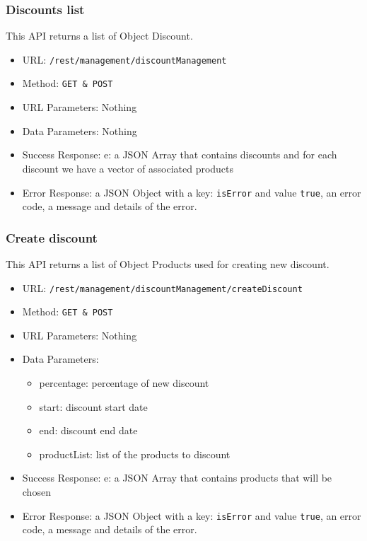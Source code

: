 \subsubsection*{Discounts list}
This API returns a list of Object Discount.

\begin{itemize}
    \item URL: \texttt{/rest/management/discountManagement}
    \item Method: \texttt{{GET \& POST}}
    \item URL Parameters: Nothing
    \item Data Parameters: Nothing
    \item Success Response: e: a JSON Array that contains discounts and for each discount we have a vector of associated products
    \item Error Response: a JSON Object with a key: \texttt{isError}  and value \texttt{true}, an error code, a message and details of the error.
\end{itemize}

\subsubsection*{Create discount}
This API returns a list of Object Products used for creating new discount.

\begin{itemize}
    \item URL: \texttt{/rest/management/discountManagement/createDiscount}
    \item Method: \texttt{{GET \& POST}}
    \item URL Parameters: Nothing
    \item Data Parameters: 
    \begin{itemize}
        \item percentage: percentage of new discount
        \item start: discount start date
        \item end: discount end date
        \item productList: list of the products to discount
    \end{itemize} 
    \item Success Response: e: a JSON Array that contains products that will be chosen
    \item Error Response: a JSON Object with a key: \texttt{isError}  and value \texttt{true}, an error code, a message and details of the error.
\end{itemize}

